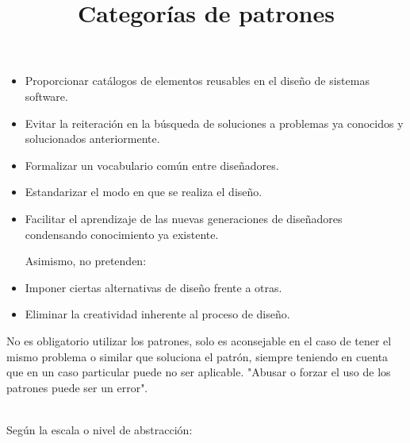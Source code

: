 \documentclass[a4paper,10pt]{report}
\begin{document}
\begin{itemize}
    \item{Proporcionar catálogos de elementos reusables en el diseño de sistemas software.\\}
    \item{Evitar la reiteración en la búsqueda de soluciones a problemas ya conocidos y solucionados anteriormente.\\}
    \item{Formalizar un vocabulario común entre diseñadores.\\}
    \item{Estandarizar el modo en que se realiza el diseño.\\}
    \item{Facilitar el aprendizaje de las nuevas generaciones de diseñadores condensando conocimiento ya existente.

Asimismo, no pretenden:\\}
    \item{Imponer ciertas alternativas de diseño frente a otras.\\}
    \item{Eliminar la creatividad inherente al proceso de diseño.\\}

\end{itemize}

No es obligatorio utilizar los patrones, solo es aconsejable en el caso de tener el mismo problema o similar que soluciona el patrón, siempre teniendo en cuenta que en un caso particular puede no ser aplicable. "Abusar o forzar el uso de los patrones puede ser un error".\\


\title{\textbf{Categorías de patrones}}\\

Según la escala o nivel de abstracción:\\
\end{document}
